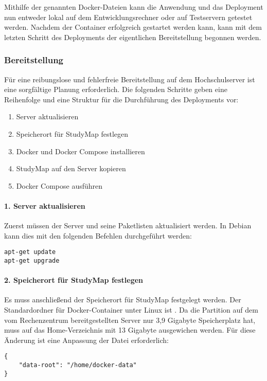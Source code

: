 Mithilfe der genannten Docker-Dateien kann die Anwendung und das Deployment nun entweder lokal auf dem Entwicklungsrechner oder auf Testservern getestet werden. Nachdem der Container erfolgreich gestartet werden kann, kann mit dem letzten Schritt des Deployments der eigentlichen Bereitstellung begonnen werden.

\subsubsection{Bereitstellung}
Für eine reibungslose und fehlerfreie Bereitstellung auf dem Hochschulserver ist eine sorgfältige Planung erforderlich. Die folgenden Schritte geben eine Reihenfolge und eine Struktur für die Durchführung des Deployments vor:
\begin{enumerate}
    \item Server aktualisieren
    \item Speicherort für StudyMap festlegen
    \item Docker und Docker Compose installieren
    \item StudyMap auf den Server kopieren
    \item Docker Compose ausführen
\end{enumerate}

\paragraph*{1. Server aktualisieren}
Zuerst müssen der Server und seine Paketlisten aktualisiert werden. In Debian kann dies mit den folgenden Befehlen durchgeführt werden:
\begin{lstlisting}[style=Python]
apt-get update
apt-get upgrade
\end{lstlisting}

\paragraph*{2. Speicherort für StudyMap festlegen}
Es muss anschließend der Speicherort für StudyMap festgelegt werden. Der Standardordner für Docker-Container unter Linux ist . Da die Partition auf dem vom Rechenzentrum bereitgestellten Server nur 3,9 Gigabyte Speicherplatz hat, muss auf das Home-Verzeichnis mit 13 Gigabyte ausgewichen werden. Für diese Änderung ist eine Anpassung der Datei  erforderlich:
\begin{lstlisting}[style=Python]
{
    "data-root": "/home/docker-data"
}
\end{lstlisting}


